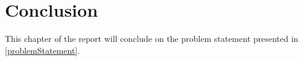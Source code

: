 \chapter{Conclusion}

This chapter of the report will conclude on the problem statement presented in \cref{problemStatement}.
